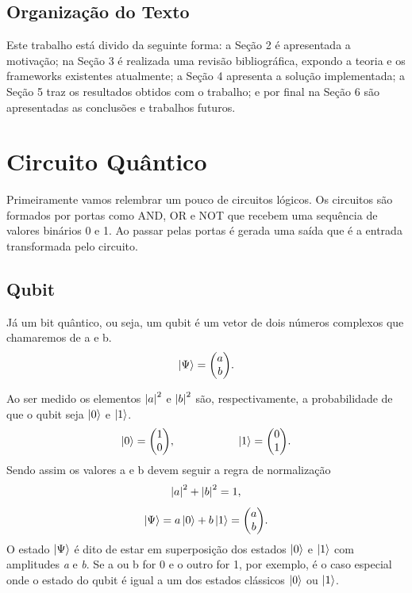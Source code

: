 \documentclass[a4paper, 12pt, oneside]{book}
\begin{document}
\section{Organização do Texto}

Este trabalho está divido da seguinte forma: a Seção 2 é apresentada a motivação; na Seção 3 é realizada uma revisão bibliográfica, expondo a teoria e os frameworks existentes atualmente; a Seção 4 apresenta a solução implementada; a Seção 5 traz os resultados obtidos com o trabalho; e por final na Seção 6 são apresentadas as conclusões e trabalhos futuros.


\chapter{Circuito Quântico}

Primeiramente vamos relembrar um pouco de circuitos lógicos. Os circuitos são formados por portas como AND, OR e NOT que recebem uma sequência de valores binários 0 e 1. Ao passar pelas portas é gerada uma saída que é a entrada transformada pelo circuito.

\section{Qubit}
Já um bit quântico, ou seja, um qubit é um vetor de dois números complexos que chamaremos de a e b.
\begin{equation} \label{eq1} 
\ket{\Psi} = \mqty(a\\b).
\end{equation}

Ao ser medido os elementos $\abs{a}^2$ e $\abs{b}^2$ são, respectivamente, a probabilidade de que o qubit seja $\ket{0}$ e $\ket{1}$. 
\begin{equation} \label{eq2}
  \ket{0} = \mqty(1\\0) ,\hspace{2cm} 
  \ket{1} = \mqty(0\\1).
\end{equation}
Sendo assim os valores a e b devem seguir a regra de normalização
\begin{equation}\label{eq3}
\abs{a}^2 + \abs{b}^2 = 1,
\end{equation}
\begin{equation}\label{eq4}
\ket{\Psi} = a\ket{0} + b\ket{1} = \mqty(a\\b).
\end{equation}
O estado $\ket{\Psi}$ é dito de estar em superposição dos estados $\ket{0}$ e $\ket{1}$ com amplitudes \textit{a} e \textit{b}. Se a ou b for 0 e o outro for 1, por exemplo, é o caso especial onde o estado do qubit é igual a um dos estados clássicos $\ket{0}$ ou $\ket{1}$.
\end{document}
